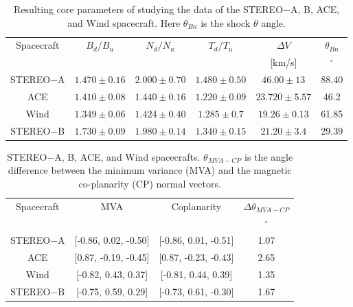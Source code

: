\documentclass[draft]{agujournal2019}
\begin{document}
\pagebreak

\begin{table}[h]
  \centering
  \caption{Resulting core parameters of studying the data of the STEREO$-$A, B, ACE, and Wind spacecraft. Here $\theta_{Bn}$ is the shock $\theta$ angle.\label{tab:coreapril1}}
\begin{tabular}{cccccc}
\hline
  Spacecraft & $B_d/B_u$  & $N_d/N_u$ & $T_d/T_u$ & $\Delta V $ & $\theta_{Bn}$\\
  & & & & [km/s] & ${}^{\circ}$\\
 \hline
STEREO$-$A   & $1.470\pm 0.16$     & $2.000\pm 0.70$ & $1.480\pm 0.50$ & $46.00\pm 13$ & 88.40 \\
ACE   & $1.410\pm 0.08$  & $1.440\pm 0.16$ & $1.220\pm 0.09$ & $23.720\pm 5.57$ & 46.2  \\
Wind    & $1.349\pm 0.06$ & $1.424\pm 0.40$ & $1.285\pm 0.7$ & $19.26\pm 0.13$ &61.85 \\
STEREO$-$B   & $1.730\pm 0.09$  & $1.980\pm 0.14$ & $1.340\pm 0.15$ & $21.20\pm 3.4$ & 29.39 \\
\end{tabular}
\end{table}

\pagebreak

\begin{table}[h]
  \centering
  \caption{STEREO$-$A, B, ACE, and Wind spacecrafts. $\theta_{MVA-CP}$ is the angle difference between the minimum variance (MVA) and the magnetic co-planarity (CP) normal vectors.\label{tab:coreapril2}}
\begin{tabular}{cccc}
\hline
  Spacecraft & MVA & Coplanarity & $\Delta\theta_{MVA-CP}$\\
  &&& ${}^{\circ}$\\
 \hline
STEREO$-$A & [-0.86,  0.02, -0.50] & [-0.86,  0.01, -0.51] & 1.07 \\
ACE & [0.87,  -0.19, -0.45] &   [0.87, -0.23, -0.43] & 2.65  \\
Wind & [-0.82,  0.43,  0.37] & [-0.81,  0.44,  0.39] & 1.35\\
STEREO$-$B & [-0.75,  0.59, 0.29] & [-0.73,  0.61, -0.30] & 1.67 \\
\end{tabular}
\end{table}

\pagebreak
\end{document}

